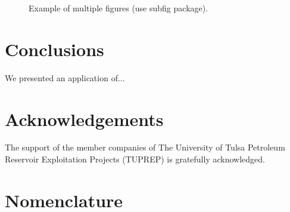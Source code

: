 \documentclass[10pt,twoside]{article}
\begin{document}
\begin{figure}[h]
\centering
    \captionsetup{justification=centering}
\captionsetup{justification=justified}
\caption{Example of multiple figures (use subfig package).}
\label{Fig:Figure2}
\end{figure}


\section{Conclusions}
\label{Sec:Conclusions}

We presented an application of...


\section{Acknowledgements}

The support of the member companies of The University of Tulsa Petroleum Reservoir Exploitation Projects (TUPREP) is gratefully acknowledged.

\section{Nomenclature}
\vskip -0.2in
\end{document}
